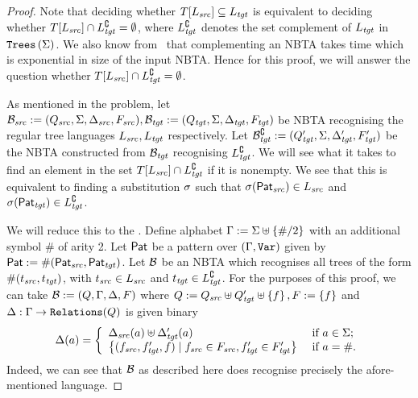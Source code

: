\begin{proof}
    Note that deciding whether $T[L_{\mathit{src}}] \subseteq L_{\mathit{tgt}}$ is equivalent to deciding whether $T[L_{\mathit{src}}] \cap L_{\mathit{tgt}}^\complement = \emptyset$, where $L_{\mathit{tgt}}^\complement$ denotes the set complement of $L_{\mathit{tgt}}$ in $\texttt{Trees}\left(\Sigma\right)$. We also know from~\cite{tata} that complementing an NBTA takes time which is exponential in size of the input NBTA. Hence for this proof, we will answer the question whether $T[L_{\mathit{src}}] \cap L_{\mathit{tgt}}^\complement = \emptyset$.

    As mentioned in the problem, let $\mathcal{B}_{\mathit{src}} := (Q_{\mathit{src}}, \Sigma, \Delta_{\mathit{src}}, F_{\mathit{src}}), \mathcal{B}_{\mathit{tgt}} := (Q_{\mathit{tgt}}, \Sigma, \Delta_{\mathit{tgt}}, F_{\mathit{tgt}})$ be NBTA recognising the regular tree languages $L_{\mathit{src}}, L_{\mathit{tgt}}$ respectively. Let $\mathcal{B}_{\mathit{tgt}}^\complement := (Q'_{\mathit{tgt}}, \Sigma, \Delta'_{\mathit{tgt}}, F'_{\mathit{tgt}})$ be the NBTA constructed from $\mathcal{B}_{\mathit{tgt}}$ recognising $L_{\mathit{tgt}}^\complement$. We will see what it takes to find an element in the set $T[L_{\mathit{src}}] \cap L_{\mathit{tgt}}^\complement$ if it is nonempty. We see that this is equivalent to finding a substitution $\sigma$ such that $\sigma(\mathsf{Pat}_{\mathit{src}}) \in L_{\mathit{src}}$ and $\sigma(\mathsf{Pat}_{\mathit{tgt}}) \in L_{\mathit{tgt}}^\complement$.

    We will reduce this to the \relationRealisabilityFull. Define alphabet $\Gamma := \Sigma \uplus \left\{ \#/2 \right\}$ with an additional symbol $\#$ of arity 2. Let $\mathsf{Pat}$ be a pattern over $(\Gamma, \texttt{Var})$ given by $\mathsf{Pat} := \#(\mathsf{Pat}_{\mathit{src}}, \mathsf{Pat}_{\mathit{tgt}})$. Let $\mathcal{B}$ be an NBTA which recognises all trees of the form $\#(t_{\mathit{src}}, t_{\mathit{tgt}})$, with $t_{\mathit{src}} \in L_{\mathit{src}}$ and $t_{\mathit{tgt}} \in L_{\mathit{tgt}}^\complement$. For the purposes of this proof, we can take $\mathcal{B} := (Q, \Gamma, \Delta, F)$ where $Q := Q_{\mathit{src}} \uplus Q'_{\mathit{tgt}} \uplus \left\{ f \right\}, F := \left\{ f \right\}$ and $\Delta : \Gamma \to \texttt{Relations}(Q)$ is given binary
    \[ \Delta(a) = \left\{ \begin{array}{ll} \Delta_{\mathit{src}}(a) \uplus \Delta'_{\mathit{tgt}}(a) & \mbox{ if } a \in \Sigma;\\ \left\{ (f_{\mathit{src}}, f'_{\mathit{tgt}}, f) \mid f_{\mathit{src}} \in F_{\mathit{src}}, f'_{\mathit{tgt}} \in F'_{\mathit{tgt}} \right\} & \mbox{ if } a = \#. \end{array} \right. \]
    Indeed, we can see that $\mathcal{B}$ as described here does recognise precisely the afore-mentioned language.


\end{proof}
